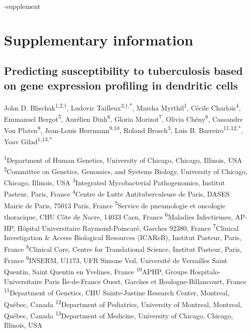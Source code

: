 \documentclass[fleqn,10pt]{wlscirep}
\newcommand{\beginsupplement}{%
 \setcounter{table}{0}
 \renewcommand{\thetable}{S\arabic{table}}%
 \setcounter{figure}{0}
 \renewcommand{\thefigure}{S\arabic{figure}}%
 }
\begin{document}
\begin{filecontents}{\jobname-supplement}
\beginsupplement
\section*{Supplementary information}

\subsection*{Predicting susceptibility to tuberculosis based on gene expression profiling in dendritic cells}


John D. Blischak\textsuperscript{1,2,$\dag$}, Ludovic
Tailleux\textsuperscript{3,$\dag$,*}, Marsha
Myrthil\textsuperscript{1}, Cécile Charlois\textsuperscript{4},
Emmanuel Bergot\textsuperscript{5}, Aurélien Dinh\textsuperscript{6},
Gloria Morizot\textsuperscript{7}, Olivia Chény\textsuperscript{8},
Cassandre Von Platen\textsuperscript{8}, Jean-Louis
Herrmann\textsuperscript{9,10}, Roland Brosch\textsuperscript{3}, Luis
B.
Barreiro\textsuperscript{1}\textsuperscript{1}\textsuperscript{,1}\textsuperscript{2}\textsuperscript{,*},
Yoav Gilad\textsuperscript{1,}\textsuperscript{13}\textsuperscript{,*}


\textsuperscript{1}Department of Human Genetics, University of
Chicago, Chicago, Illinois, USA
\textsuperscript{2}Committee on Genetics, Genomics, and Systems
Biology, University of Chicago, Chicago, Illinois, USA
\textsuperscript{3}Integrated Mycobacterial Pathogenomics, Institut
Pasteur, Paris, France
\textsuperscript{4}Centre de Lutte Antituberculeuse de Paris, DASES
Mairie de Paris, 75013 Paris, France
\textsuperscript{5}Service de pneumologie et oncologie thoracique, CHU
Côte de Nacre, 14033 Caen, France
\textsuperscript{6}Maladies Infectieuses, AP-HP, Hôpital Universitaire
Raymond-Poincaré, Garches 92380, France
\textsuperscript{7}Clinical Investigation \& Access Biological
Resources (ICAReB), Institut Pasteur, Paris, France
\textsuperscript{8}Clinical Core, Centre for Translational Science,
Institut Pasteur, Paris, France
\textsuperscript{9}INSERM, U1173, UFR Simone Veil, Université de
Versailles Saint Quentin, Saint Quentin en Yvelines, France
\textsuperscript{10}APHP, Groupe Hospitalo-Universitaire Paris
Île-de-France Ouest, Garches et Boulogne-Billancourt, France
\textsuperscript{11}Department of Genetics, CHU Sainte-Justine
Research Center, Montreal, Québec, Canada
\textsuperscript{12}Department of Pediatrics, University of Montreal,
Montreal, Québec, Canada
\textsuperscript{13}Department of Medicine, University of Chicago,
Chicago, Illinois, USA



\end{filecontents}
\end{document}
